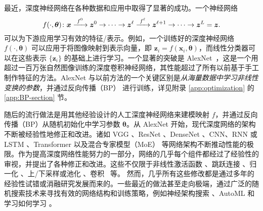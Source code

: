\documentclass[../../book-main.tex]{subfiles}
\begin{document}
最近，深度神经网络在各种数据和应用中取得了显著的成功。一个神经网络
\begin{equation}
  f(\cdot, \bm \theta) \colon \bm{x}
  \xrightarrow{\hspace{1mm} f^0 \hspace{1mm}} \bm{z}^0 \rightarrow \cdots
  \rightarrow \bm{z}^\ell \xrightarrow{\hspace{1mm} f^\ell \hspace{1mm}}
  \bm{z}^{\ell+1} \rightarrow  \cdots \to \bm{z}^L = \bm{z}.
\end{equation}
可以为下游应用学习有效的特征/表示。例如，一个训练好的深度神经网络 $f(\cdot, \bm \theta)$ 可以应用于将图像映射到表示向量，即 $\bm{z}_i = f(\bm{x}_i,\bm \theta)$，而线性分类器可以在这些表示 $\{\bm{z}_i\}$ 的基础上进行学习。一个显著的突破是 AlexNet~\cite{krizhevsky2012imagenet}，这是一个用超过一百万张自然图像训练的深度卷积神经网络，其性能超过了所有以前基于手工制作特征的方法。AlexNet 与以前方法的一个关键区别是\textit{从海量数据中学习非线性变换的参数}，并通过反向传播（BP）\cite{Back-Prop} 进行训练，详见附录 \ref{app:optimization} 的 \ref{app:BP-section} 节。



随后的流行做法是用其他经验设计的人工深度神经网络来建模映射 $f$，并通过反向传播（BP）从随机初始化中学习参数 $\bm \theta$。从 AlexNet \cite{krizhevsky2012imagenet} 开始，现代深度网络的架构不断被经验性地修正和改进。诸如 VGG \cite{simonyan2014very}、ResNet \cite{he2016deep}、DenseNet \cite{dense-net}、CNN、RNN 或 LSTM \cite{LSTM}、Transformer \cite{vaswani2017attention} 以及混合专家模型（MoE）\cite{MoE,Fedus-2022} 等网络架构不断推动性能的极限。作为提高深度网络性能努力的一部分，网络的几乎每个组件都经过了经验性的审视，并提出了各种修正和改进。这些不仅限于非线性激活函数 \cite{maas2013rectifier,klambauer2017self,xu2015empirical,nwankpa2018activation}、跳跃连接 \cite{ronneberger2015u,he2016deep}、归一化 \cite{ioffe2015batch,ba2016layer,ulyanov2016instance,wu2018group,miyato2018spectral}、上/下采样或池化 \cite{scherer2010evaluation}、卷积~\cite{lecun1998gradient,krizhevsky2012imagenet} 等。
然而，几乎所有这些修改都是通过多年的经验性{试错}或消融研究发展而来的。一些最近的做法甚至走向极端，通过广泛的随机搜索技术来寻找有效的网络结构和训练策略，例如神经架构搜索 \cite{NAS-1,Baker2017DesigningNN}、AutoML \cite{automl} 和学习如何学习 \cite{andrychowicz2016learning}。
\end{document}
